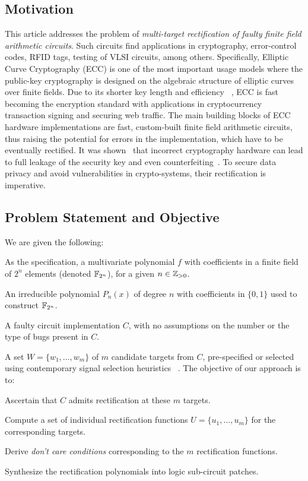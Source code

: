 \subsection{Motivation}
This article addresses the problem of {\it multi-target rectification
of faulty finite field arithmetic circuits}.
Such circuits find applications in cryptography,
error-control codes, RFID tags, testing of VLSI circuits, among others. Specifically, Elliptic Curve Cryptography (ECC) is one of the most important usage models where the public-key cryptography is designed on the algebraic structure of elliptic curves over finite fields. Due to its shorter key length and efficiency ~\cite{ecc_app:2016}, 
ECC is fast becoming the encryption standard with applications in cryptocurrency transaction signing and securing web traffic.
The main building blocks of ECC hardware implementations 
are fast, custom-built finite field arithmetic circuits, 
thus raising the potential for errors in the implementation, 
which have to be eventually rectified. 
It was shown~\cite{crypto:bug_attacks} that incorrect cryptography 
hardware can lead to full leakage of the security key and even
counterfeiting~\cite{crypto:counterfeit}.
To secure data privacy and avoid vulnerabilities in crypto-systems, their
rectification is imperative.



\subsection{Problem Statement and Objective}
We are given the following: 
\bi
\item As the specification, a multivariate
polynomial $f$ with coefficients in a finite field of $2^n$ elements
(denoted ${\mathbb{F}}_{2^n}$), for a given  $n\in {\mathbb{Z}}_{> 0}$.
\item An irreducible
polynomial $P_n(x)$ of degree $n$ with coefficients in $\{0,1\}$ used 
to construct ${\mathbb{F}}_{2^n}$.
\item A faulty circuit implementation $C$,
with no assumptions on the number or the type of bugs present in
$C$. 
\item A set $W = \{w_1,\dots,w_m\}$ of $m$ candidate targets from $C$,
pre-specified or selected using contemporary signal selection heuristics 
~\cite{SS_Alan:DAC18,SS_Fujita:ISCAS19,SS_Roland:DAC19}.
\ei
The objective of our approach is to: 
\bi
 \item Ascertain that $C$ 
admits rectification at these $m$ targets.
\item Compute a set
of individual rectification functions $U =
\{u_1,\dots,u_m\}$ for the corresponding targets. 
\item Derive {\it don't care conditions}
corresponding to the $m$ rectification functions. 
\item Synthesize
the rectification polynomials into logic sub-circuit patches.
\ei

